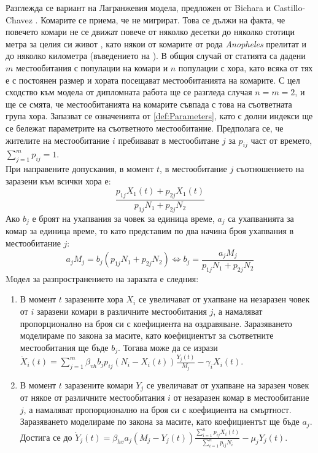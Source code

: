 Разглежда се вариант на Лагранжевия модела, предложен от Bichara и Castillo-Chavez \cite{Bichara2016}.
Комарите се приема, че не мигрират.
Това се дължи на факта, че повечето комари не се движат повече от няколко десетки до няколко стотици метра за целия си живот \cite{Elbers2015}, като някои от комарите от рода \textit{Anopheles} прелитат и до няколко километра (въведението на \cite{Bichara2016}).
В общия случай от статията са дадени $m$ местообитания с популации на комари и $n$ популации с хора, като всяка от тях е с постоянен размер и хората посещават местообитанията на комарите.
С цел сходство към модела от дипломната работа ще се разгледа случая $n=m=2$, и ще се смята, че местообитанията на комарите съвпада с това на съответната група хора.
Запазват се означенията от \ref{def:Parameters}, като с долни индекси ще се бележат параметрите на съответното местообитание.
Предполага се, че жителите на местообитание $i$ пребивават в местообитане $j$ за $p_{ij}$ част от времето, $\sum_{j=1}^m p_{ij} = 1$. \\
При направените допускания, в момент $t$, в местообитание $j$ съотношението на заразени към всички хора е:
\begin{equation}
  \frac{p_{1j} X_1(t) + p_{2j} X_1(t)}{p_{1j} N_1 + p_{2j} N_2}
\end{equation}
Ако $b_j$ е броят на ухапвания за човек за единица време, $a_j$ са ухапванията за комар за единица време, то като представим по два начина броя ухапвания в местообитание $j$:
\begin{equation}
  a_j M_j = b_j (p_{1j} N_1 + p_{2j} N_2) \iff b_j = \frac{a_j M_j}{p_{1j} N_1 + p_{2j} N_2}
\end{equation}
Mодел за разпространението на заразата е следния:
\begin{enumerate}
  \item В момент $t$ заразените хора $X_i$ се увеличават от ухапване на незаразен човек от $i$ заразени комари в различните местообитания $j$, а намаляват пропорционално на броя си с коефициента на оздравяване. Заразяването моделираме по закона за масите, като коефициентът за съответните местообитания ще бъде $b_j$. Тогава може да се изрази $\dot{X}_i(t) = \sum_{j=1}^{m} \beta_{vh} b_j p_{ij} (N_i - X_i(t)) \frac{Y_j(t)}{M_j} - \gamma_i X_i(t)$.
  \item В момент $t$ заразените комари $Y_j$ се увеличават от ухапване на заразен човек от някое от различните местообитания $i$ от незаразен комар в местообитание $j$, а намаляват пропорционално на броя си с коефициента на смъртност. Заразяването моделираме по закона за масите, като коефициентът ще бъде $a_j$. Достига се до $\dot{Y}_j(t) = \beta_{hv} a_j (M_j - Y_j(t)) \frac{\sum_{i=1}^n p_{ij} X_i(t)}{\sum_{i=1}^n p_{ij} N_i} - \mu_j Y_j(t)$.
\end{enumerate}
